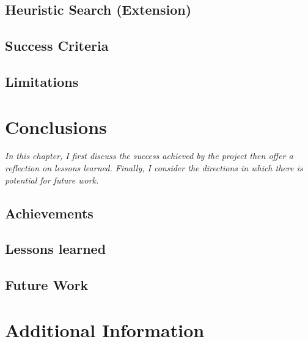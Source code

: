 \documentclass[12pt,a4paper,twoside,openright]{report}
\begin{document}
\section{Heuristic Search (Extension)}

\section{Success Criteria}

\section{Limitations}



\chapter{Conclusions}
\textit{In this chapter, I first discuss the success achieved by the project then offer a reflection on lessons learned. Finally, I consider the directions in which there is potential for future work.}
\section{Achievements}

\section{Lessons learned}

\section{Future Work}

\cite{finkensiep_modeling_2021}


\nocite{*}
% 




\appendix

\chapter{Additional Information}
\end{document}
